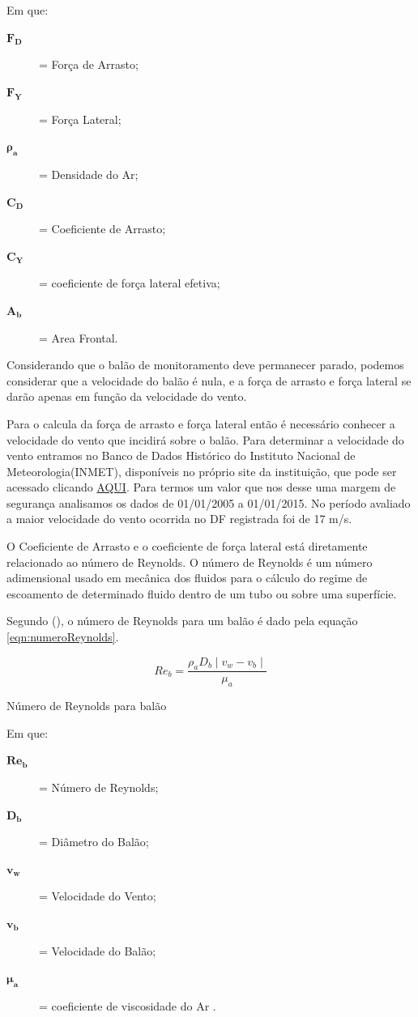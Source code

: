 	Em que:
	\begin{description}
		\item[$\boldsymbol{F_{D}}$] = Força de Arrasto;
		\item[$\boldsymbol{F_{Y}}$] = Força Lateral;
		\item[$\boldsymbol{\rho_{a}}$] = Densidade do Ar;
		\item[$\boldsymbol{C_{D}}$] = Coeficiente de Arrasto;
		\item[$\boldsymbol{C_{Y}}$] = coeficiente de força lateral efetiva;
		\item[$\boldsymbol{A_{b}}$] = Area Frontal.
	\end{description}

	Considerando que o balão de monitoramento deve permanecer parado, podemos considerar que a velocidade do balão é nula, e a força de arrasto e força lateral se darão apenas em função da velocidade do vento.

	Para o calcula da força de arrasto e força lateral então é necessário conhecer a velocidade do vento que incidirá sobre o balão. Para determinar a velocidade do vento entramos no Banco de Dados Histórico do Instituto Nacional de Meteorologia(INMET), disponíveis no próprio site da instituição, que pode ser acessado clicando \href{www.inmet.gov.br}{AQUI}. Para termos um valor que nos desse uma margem de segurança analisamos os dados de 01/01/2005 a 01/01/2015. No período avaliado a maior velocidade do vento ocorrida no DF registrada foi de 17 m/s.

	O Coeficiente de Arrasto e o coeficiente de força lateral está diretamente relacionado ao número de Reynolds. O número de Reynolds é um número adimensional usado em mecânica dos fluidos para o cálculo do regime de escoamento de determinado fluido dentro de um tubo ou sobre uma superfície.~\cite{bird}

	Segundo  (\citeyear{yajima}), o número de Reynolds para um balão é dado pela equação \eqref{eqn:numeroReynolds}.

	\begin{equacao}
		\begin{equation}
			Re_{b} = \frac{\rho_{a} D_{b} \mid v_{w} - v_{b} \mid}{\mu_{a}}
		\end{equation}
		\caption{Número de Reynolds para balão}
		\label{eqn:numeroReynolds}
	\end{equacao}

	Em que:
	\begin{description}
		\item[$\boldsymbol{Re_{b}}$] = Número de Reynolds;
		\item[$\boldsymbol{D_{b}}$] = Diâmetro do Balão;
		\item[$\boldsymbol{v_{w}}$] = Velocidade do Vento;
		\item[$\boldsymbol{v_{b}}$] = Velocidade do Balão;
		\item[$\boldsymbol{\mu_{a}}$] = coeficiente de viscosidade do Ar .
	\end{description}

